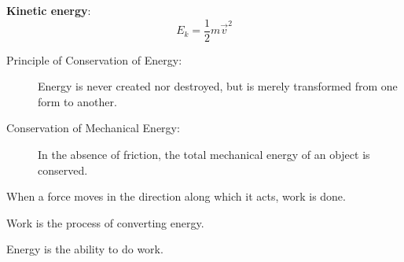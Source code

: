 \textbf{Kinetic energy}:
\begin{equation}
E_{k} = \frac{1}{2}m\vec{v}^{2}
\end{equation}

\begin{description}
\item[Principle of Conservation of Energy:] Energy is never created nor
destroyed, but is merely transformed from one form to another.
\item[Conservation of Mechanical Energy:] In the absence of friction,
the total mechanical energy of an object is conserved.
\end{description}

When a force moves     in the direction along which it acts,   work is done.

Work is the process of converting energy.

Energy is the ability to do work.

